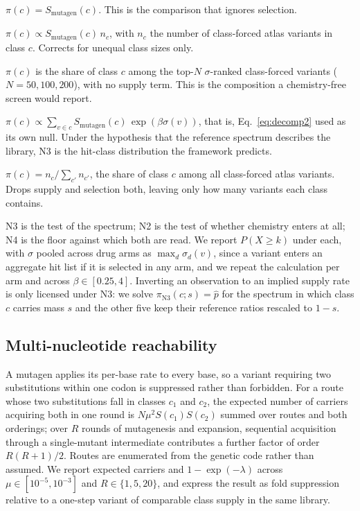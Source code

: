 \documentclass[11pt,a4paper]{article}
\begin{document}
\begin{description}\itemsep2pt
\item[N0, raw spectrum.] $\pi(c) = S_{\mathrm{mutagen}}(c)$. This is
  the comparison that ignores selection.
\item[N1, supply $\times$ composition.] $\pi(c) \propto
  S_{\mathrm{mutagen}}(c)\, n_c$, with $n_c$ the number of class-forced
  atlas variants in class $c$. Corrects for unequal class sizes only.
\item[N2, selection only.] $\pi(c)$ is the share of class $c$ among the
  top-$N$ $\sigma$-ranked class-forced variants ($N = 50, 100, 200$),
  with no supply term. This is the composition a chemistry-free screen
  would report.
\item[N3, model-implied.] $\pi(c) \propto \sum_{v \in c}
  S_{\mathrm{mutagen}}(c)\,\exp(\beta\sigma(v))$, that is,
  Eq.~\ref{eq:decomp2} used as its own null. Under the hypothesis that
  the reference spectrum describes the library, N3 is the hit-class
  distribution the framework predicts.
\item[N4, atlas composition.] $\pi(c) = n_c / \sum_{c'} n_{c'}$, the
  share of class $c$ among all class-forced atlas variants. Drops
  supply and selection both, leaving only how many variants each class
  contains.
\end{description}

N3 is the test of the spectrum; N2 is the test of whether chemistry
enters at all; N4 is the floor against which both are read. We report $P(X \geq k)$ under each, with $\sigma$ pooled
across drug arms as $\max_d \sigma_d(v)$, since a variant enters an
aggregate hit list if it is selected in any arm, and we repeat the
calculation per arm and across $\beta \in [0.25, 4]$. Inverting an
observation to an implied supply rate is only licensed under N3: we
solve $\pi_{\mathrm{N3}}(c; s) = \hat p$ for the spectrum in which
class $c$ carries mass $s$ and the other five keep their reference
ratios rescaled to $1 - s$.

\subsection{Multi-nucleotide reachability}
\label{sec:two-hit}
A mutagen applies its per-base rate to every base, so a variant
requiring two substitutions within one codon is suppressed rather than
forbidden. For a route whose two substitutions fall in classes $c_1$
and $c_2$, the expected number of carriers acquiring both in one round
is $N\mu^2 S(c_1)S(c_2)$ summed over routes and both orderings;
over $R$ rounds of mutagenesis and expansion, sequential acquisition
through a single-mutant intermediate contributes a further factor of
order $R(R+1)/2$. Routes are enumerated from the genetic code rather
than assumed. We report expected carriers and $1 - \exp(-\lambda)$
across $\mu \in [10^{-5}, 10^{-3}]$ and $R \in \{1, 5, 20\}$, and
express the result as fold suppression relative to a one-step variant
of comparable class supply in the same library.
\end{document}
